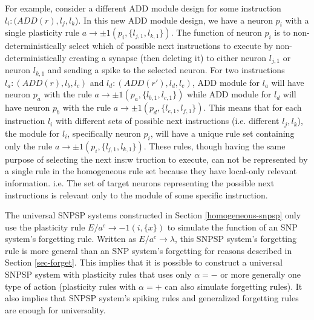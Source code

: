 \documentclass[runningheads,a4paper]{llncs}
\begin{document}
For example, consider a different ADD module design for some instruction $l_i: (ADD(r), l_j, l_k$). In this new ADD module design, we have a neuron 
$p_i$ with a single plasticity rule $a \rightarrow \pm1(p_i, \{l_{j,1}, l_{k,1}\})$. The function of neuron $p_i$ is to non-deterministically select 
which of possible next instructions to execute by non-deterministically creating a synapse (then deleting it) to either neuron $l_{j,1}$ or 
neuron $l_{k,1}$ and sending a spike to the selected neuron. For two instructions $l_a: (ADD(r), l_b,l_c)$ and $l_d:(ADD(r'), l_d, l_e)$, ADD module
for $l_a$ will have neuron $p_a$ with the rule $a \rightarrow \pm1(p_a,\{l_{b,1}, l_{c,1}\})$ while ADD module for $l_d$ will have neuron $p_b$ with
the rule $a \rightarrow \pm1(p_d,\{l_{e,1}, l_{f,1}\})$. This means that for each instruction $l_i$ with different sets of possible next instructions 
(i.e. different $l_j, l_k$), the module for $l_i$, specifically neuron $p_i$, will have a unique rule set containing only  the rule $a \rightarrow \pm1(p_i,
\{l_{j,1}, l_{k,1}\})$. These rules, though having the same purpose of selecting the next ins:w
truction to execute, can not be represented by a single
rule in the homogeneous rule set because they have local-only relevant information. i.e. The set of target neurons representing the possible next
instructions is relevant only to the module of some specific instruction.

The universal SNPSP systems constructed in Section \ref{homogeneous-snpsp} only use the plasticity rule $E/a^c \rightarrow -1(i,\{x\})$ to simulate
the function of an SNP system's forgetting rule. Written as $E/a^c \rightarrow \lambda$, this SNPSP system's forgetting rule is more general than
an SNP system's forgetting for reasons described in Section \ref{sec-forget}. This implies that it is possible to construct a universal SNPSP system
with plasticity rules that uses only $\alpha = -$ or more generally one type of action (plasticity rules with $\alpha = +$ can also simulate 
forgetting rules). It also implies that SNPSP system's spiking rules and  generalized forgetting rules are enough for universality.

\end{document}
